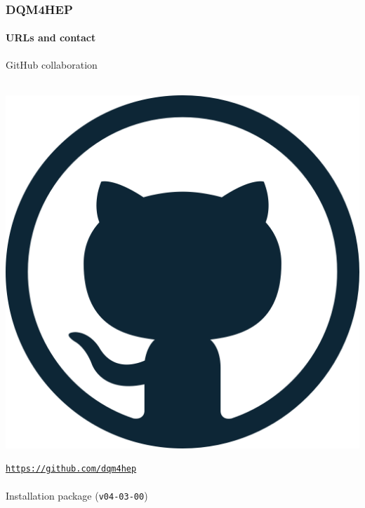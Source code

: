 \documentclass[presentation, 10pt]{beamer}
\begin{document}
\begin{frame}
  \frametitle{DQM4HEP}
  \framesubtitle{URLs and contact}
  GitHub collaboration\\
  \vspace*{0.1cm}
  ~~~
  \begin{minipage}{0.03\linewidth}
    \includegraphics[width=\linewidth]{figs/github-logo.png}
  \end{minipage}
  \href{https://github.com/dqm4hep}{\tt https://github.com/dqm4hep} \\
  ~\\
  Installation package (\texttt{v04-03-00}) \\
  \vspace*{0.1cm}
  ~~~
  \begin{minipage}{0.03\linewidth}

\end{minipage}
\end{frame}
\end{document}
